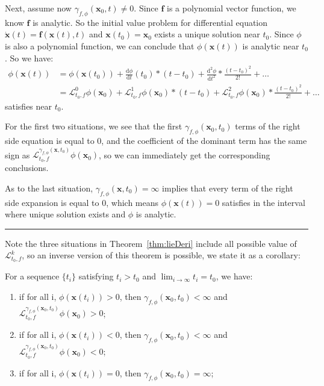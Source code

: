 \documentclass{jssc}
\newcommand{\rulex}{\hfill\rule{1mm}{3mm}}
\begin{document}
Next, assume now $\gamma_{f, \phi}(\boldsymbol{x}_0, t) \neq 0$. Since $\boldsymbol{f}$ is a polynomial vector function, we know $\boldsymbol{f}$ is analytic. So the initial value problem for differential equation $\dot{\boldsymbol{x}}(t) = \boldsymbol{f}(\boldsymbol{x}(t),t)$ and $\boldsymbol{x}(t_0) = \boldsymbol{x}_0$ exists a unique solution near $t_0$\cite{tenenbaum1963ordinary}. Since $\phi$ is also a polynomial function, we can conclude that $\phi(\boldsymbol{x}(t))$ is analytic near $t_0$. So we have:
	\begin{equation*}
		\begin{split}
		\phi(\boldsymbol{x}(t)) &= \phi(\boldsymbol{x}(t_0)) + \frac{\mathrm{d} \phi}{\mathrm{d}t}(t_0) * (t-t_0) + \frac{\mathrm{d}^2 \phi}{\mathrm{d}t^2} * \frac{(t-t_0)^2}{2!} + \dots \\
							&= {\mathcal{L}_{t_0, f}^0 \phi(\boldsymbol{x}_0)} + \mathcal{L}_{t_0, f}^1 \phi(\boldsymbol{x}_0) * (t-t_0) + \mathcal{L}_{t_0, f}^2 \phi(\boldsymbol{x}_0) * \frac{(t-t_0)^2}{2!} + \dots
		\end{split}
	\end{equation*}
satisfies near $t_0$.

For the first two situations, we see that the first $\gamma_{f, \phi}(\boldsymbol{x}_0, t_0)$ terms of the right side equation is equal to 0, and the coefficient of the dominant term has the same sign as $\mathcal{L}_{t_0, f}^{\gamma_{f, \phi}(\boldsymbol{x}, t_0)} \phi (\boldsymbol{x}_0)$, so we can immediately get the corresponding conclusions.

As to the last situation, $\gamma_{f, \phi}(\boldsymbol{x}, t_0) = \infty$ implies that every term of the right side expansion is equal to 0, which means $\phi (\boldsymbol{x}(t)) =0$ satisfies in the interval where unique solution exists and $\phi$ is analytic.
\rulex

Note the three situations in Theorem~\ref{thm:lieDeri} include all possible value of $\mathcal{L}_{t_0, f}^{k}$, so an inverse version of this theorem is possible, we state it as a corollary:

\begin{corollary}
\label{cor:lieDeri}
For a sequence $\{ t_i \}$  satisfying $t_i > t_0$ and $\lim_{i \to \infty} t_i = t_0$, we have:
\begin{enumerate}
	\item if for all i, $\phi(\boldsymbol{x}(t_i)) > 0$, then $\gamma_{f, \phi}(\boldsymbol{x}_0, t_0) < \infty$ and $\mathcal{L}_{t_0, f}^{\gamma_{f, \phi}(\boldsymbol{x}_0, t_0)} \phi (\boldsymbol{x}_0) > 0$;
	\item if for all i, $\phi(\boldsymbol{x}(t_i)) < 0$, then $\gamma_{f, \phi}(\boldsymbol{x}_0, t_0) < \infty$ and $\mathcal{L}_{t_0, f}^{\gamma_{f, \phi}(\boldsymbol{x}_0, t_0)} \phi (\boldsymbol{x}_0) < 0$;
	\item if for all i, $\phi(\boldsymbol{x}(t_i)) = 0$, then $\gamma_{f, \phi}(\boldsymbol{x}_0, t_0) = \infty$;
\end{enumerate}
\end{corollary}
\end{document}
